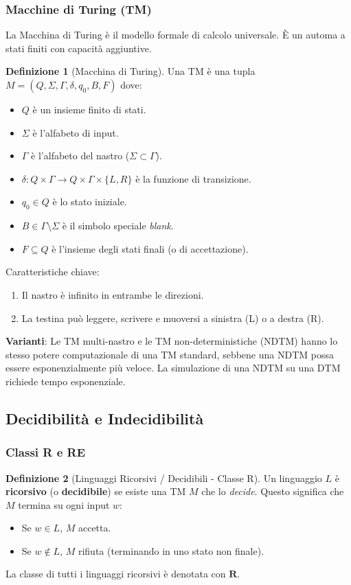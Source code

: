 \documentclass[a4paper]{article}
\theoremstyle{definition} %
\newtheorem{definition}{Definizione}
\begin{document}
\subsubsection{Macchine di Turing (TM)}
La Macchina di Turing è il modello formale di calcolo universale. È un automa a stati finiti con capacità aggiuntive.
\begin{definition}[Macchina di Turing]
Una TM è una tupla $M = (Q, \Sigma, \Gamma, \delta, q_0, B, F)$ dove:
\begin{itemize}
    \item $Q$ è un insieme finito di stati.
    \item $\Sigma$ è l'alfabeto di input.
    \item $\Gamma$ è l'alfabeto del nastro ($\Sigma \subset \Gamma$).
    \item $\delta: Q \times \Gamma \to Q \times \Gamma \times \{L, R\}$ è la funzione di transizione.
    \item $q_0 \in Q$ è lo stato iniziale.
    \item $B \in \Gamma \setminus \Sigma$ è il simbolo speciale \emph{blank}.
    \item $F \subseteq Q$ è l'insieme degli stati finali (o di accettazione).
\end{itemize}
\end{definition}
Caratteristiche chiave:
\begin{enumerate}
    \item Il nastro è infinito in entrambe le direzioni.
    \item La testina può leggere, scrivere e muoversi a sinistra (L) o a destra (R).
\end{enumerate}
\textbf{Varianti}: Le TM multi-nastro e le TM non-deterministiche (NDTM) hanno lo stesso potere computazionale di una TM standard, sebbene una NDTM possa essere esponenzialmente più veloce. La simulazione di una NDTM su una DTM richiede tempo esponenziale.

\subsection{Decidibilità e Indecidibilità}
\subsubsection{Classi R e RE}
\begin{definition}[Linguaggi Ricorsivi / Decidibili - Classe R]
Un linguaggio $L$ è \textbf{ricorsivo} (o \textbf{decidibile}) se esiste una TM $M$ che lo \emph{decide}. Questo significa che $M$ termina su ogni input $w$:
\begin{itemize}
    \item Se $w \in L$, $M$ accetta.
    \item Se $w \notin L$, $M$ rifiuta (terminando in uno stato non finale).
\end{itemize}
La classe di tutti i linguaggi ricorsivi è denotata con $\mathbf{R}$.
\end{definition}
\end{document}
